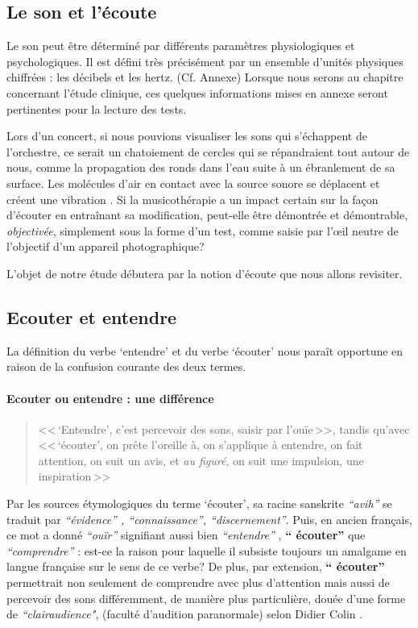 
\subsection{Le son et l'écoute}


Le son peut être déterminé par différents paramètres
physiologiques et psychologiques.
Il est défini très précisément par un ensemble d'unités physiques chiffrées
: les décibels  et les hertz. (Cf. Annexe)
Lorsque nous serons au chapitre concernant l'étude clinique,
ces quelques informations mises en annexe seront pertinentes pour la lecture des tests.

Lors d'un concert, si nous pouvions visualiser les sons qui
s'échappent de l'orchestre, ce serait un chatoiement de cercles qui se
répandraient tout autour de nous, comme
la propagation des
ronds dans l'eau suite à un ébranlement de sa surface.
Les molécules d'air en contact avec la source sonore se déplacent et
créent une vibration \autocite[p. 183]{bencivelli:pourquoi,}.
Si la
musicothérapie a un impact certain sur la façon d'écouter en
entraînant sa
modification, peut-elle être  démontrée et démontrable, \textsl{objectivée},
simplement sous la forme d'un test, comme saisie par
l'\oe il neutre de l'objectif d'un appareil
photographique?

L'objet de notre étude débutera par la notion d'écoute que nous allons revisiter.
\subsection{Ecouter et entendre}
La définition du verbe `entendre' et du verbe `écouter'
nous paraît opportune
en raison de la confusion courante des deux termes.
\paragraph{Ecouter ou entendre : une différence}
\begin{quote}<<\,`Entendre', c'est  percevoir des sons, saisir par l'ouïe\,>>, tandis qu'avec
<<\,`écouter', on prête l'oreille à, on s'applique à entendre, on fait attention, on suit un avis, et \emph{au figuré}, on suit une impulsion, une inspiration\,>> \autocite[pp. 361--385]{hachette:dictionnaire} \end{quote}
Par les sources étymologiques du
terme `écouter',
 sa racine sanskrite \emph{ ``avih'' } se traduit par
 \emph{``évidence'' , ``connaissance'', ``discernement''}. Puis, en ancien
 français, ce mot a donné \textit{``ouïr''} signifiant aussi bien \textit{``entendre''} ,
\textbf{`` écouter'' } que \textit{``comprendre''} \autocite {etymologieWeb}:
 est-ce la raison
pour laquelle il subsiste toujours un amalgame en langue française
sur le sens de ce verbe?
De plus, par extension, \textbf{`` écouter'' }
permettrait non seulement de comprendre avec plus d'attention
mais aussi de percevoir des sons différemment, de manière plus particulière, douée d'une forme de
\textit{``clairaudience"}, (faculté d'audition paranormale) selon Didier
Colin \autocite {colin2015}.

